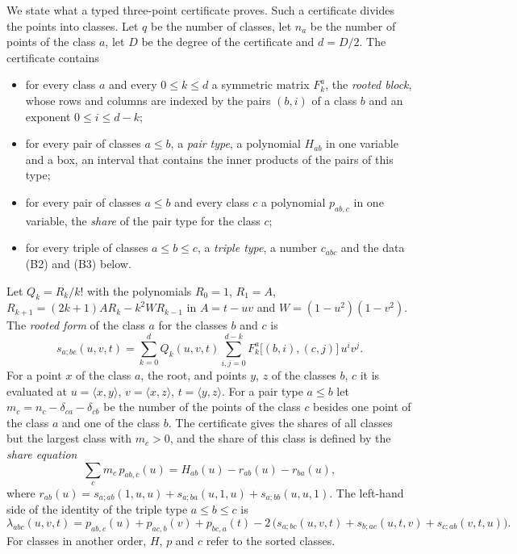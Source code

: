 \documentclass[reqno,a4paper,11pt]{amsart}
\numberwithin{equation}{section}
\begin{document}
We state what a typed three-point certificate proves. Such a certificate divides the points into classes. Let $q$ be the number of classes, let $n_a$ be the number of points of the class $a$, let $D$ be the degree of the certificate and $d = D/2$. The certificate contains
\begin{itemize}
    \item for every class $a$ and every $0 \leq k \leq d$ a symmetric matrix $F^a_k$, the \emph{rooted block}, whose rows and columns are indexed by the pairs $(b, i)$ of a class $b$ and an exponent $0 \leq i \leq d - k$;
    \item for every pair of classes $a \leq b$, a \emph{pair type}, a polynomial $H_{ab}$ in one variable and a box, an interval that contains the inner products of the pairs of this type;
    \item for every pair of classes $a \leq b$ and every class $c$ a polynomial $p_{ab,c}$ in one variable, the \emph{share} of the pair type for the class $c$;
    \item for every triple of classes $a \leq b \leq c$, a \emph{triple type}, a number $c_{abc}$ and the data (B2) and (B3) below.
\end{itemize}
Let $Q_k = R_k / k!$ with the polynomials $R_0 = 1$, $R_1 = A$, $R_{k+1} = (2k+1) A R_k - k^2 W R_{k-1}$ in $A = t - uv$ and $W = (1-u^2)(1-v^2)$. The \emph{rooted form} of the class $a$ for the classes $b$ and $c$ is
$$
s_{a;bc}(u,v,t) = \sum_{k=0}^{d} Q_k(u,v,t) \sum_{i,j=0}^{d-k} F^a_k\big[(b,i),(c,j)\big] \, u^i v^j .
$$
For a point $x$ of the class $a$, the root, and points $y$, $z$ of the classes $b$, $c$ it is evaluated at $u = \langle x, y \rangle$, $v = \langle x, z \rangle$, $t = \langle y, z \rangle$. For a pair type $a \leq b$ let $m_c = n_c - \delta_{ca} - \delta_{cb}$ be the number of the points of the class $c$ besides one point of the class $a$ and one of the class $b$. The certificate gives the shares of all classes but the largest class with $m_c > 0$, and the share of this class is defined by the \emph{share equation}
\begin{equation}\label{eq:shareeq}
\sum_{c} m_c \, p_{ab,c}(u) = H_{ab}(u) - r_{ab}(u) - r_{ba}(u),
\end{equation}
where $r_{ab}(u) = s_{a;ab}(1,u,u) + s_{a;ba}(u,1,u) + s_{a;bb}(u,u,1)$.
The left-hand side of the identity of the triple type $a \leq b \leq c$ is
$$
\lambda_{abc}(u,v,t) = p_{ab,c}(u) + p_{ac,b}(v) + p_{bc,a}(t) - 2 \, \big( s_{a;bc}(u,v,t) + s_{b;ac}(u,t,v) + s_{c;ab}(v,t,u) \big) .
$$
For classes in another order, $H$, $p$ and $c$ refer to the sorted classes.
\end{document}
